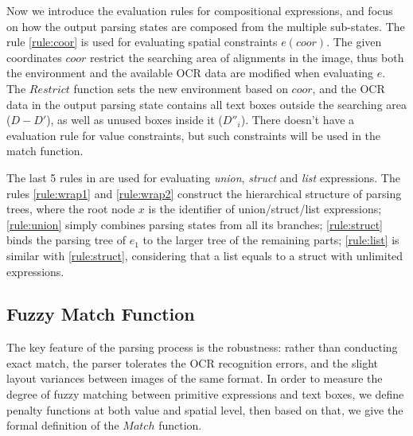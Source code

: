 Now we introduce the evaluation rules for compositional expressions,
and focus on how the output parsing states are composed from
the multiple sub-states.
The rule \ref{rule:coor} is used for evaluating spatial constraints $e(coor)$.
The given coordinates $coor$ restrict the searching area of alignments
in the image, thus both the environment and the available OCR data are modified
when evaluating $e$.
The $Restrict$ function sets the new environment based on $coor$,
and the OCR data in the output parsing state contains
all text boxes outside the searching area ($D-D'$),
as well as unused boxes inside it ($D''_i$).
There doesn't have a evaluation rule for value constraints,
but such constraints will be used in the match function.

The last 5 rules in  are used for evaluating
\textit{union}, \textit{struct} and \textit{list} expressions.
The rules \ref{rule:wrap1} and \ref{rule:wrap2}
construct the hierarchical structure of parsing trees,
where the root node $x$ is the identifier of union/struct/list expressions;
\ref{rule:union} simply combines parsing states from all its branches;
\ref{rule:struct} binds the parsing tree of $e_1$ to the larger tree of
the remaining parts;
\ref{rule:list} is similar with \ref{rule:struct}, considering that
a list equals to a struct with unlimited expressions.



\subsection{Fuzzy Match Function}
The key feature of the parsing process is the robustness:
rather than conducting exact match,
the parser tolerates the OCR recognition errors,
and the slight layout variances between images of the same format.
In order to measure the degree of fuzzy matching
between primitive expressions and text boxes,
we define penalty functions at both value and spatial level,
then based on that, we give the formal definition of the $Match$ function.


